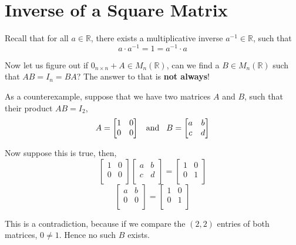 \newpage
\section{Inverse of a Square Matrix}
Recall that for all $a \in \mathbb{R}$, there exists a multiplicative inverse $a^{-1} \in \mathbb{R}$, such that 
$$a \cdot a^{-1} = 1 =  a^{-1} \cdot a$$

Now let us figure out if $0_{n \times n} + A \in M_n(\mathbb{R})$, can we find a $B \in M_n(\mathbb{R})$ such that $AB = I_n = BA$? The answer to that is \textbf{not always}!

As a counterexample, suppose that we have two matrices $A$ and $B$, such that their product $AB = I_2$,
$$A = \left [
\begin{matrix}
1 & 0 \\
0 & 0 \\
\end{matrix} \right ] \hspace{0.3cm} \text{and} \hspace{0.3cm} 
B = \left [
\begin{matrix}
a & b \\
c & d \\
\end{matrix} \right ]$$

Now suppose this is true, then,
$$\left [
\begin{matrix}
1 & 0 \\
0 & 0 \\
\end{matrix} \right ]
\left [
\begin{matrix}
a & b \\
c & d \\
\end{matrix} \right ] = 
\left [
\begin{matrix}
1 & 0 \\
0 & 1 \\
\end{matrix} \right ]$$
$$\left [
\begin{matrix}
a & b \\
0 & 0 \\
\end{matrix} \right ] = 
\left [
\begin{matrix}
1 & 0 \\
0 & 1 \\
\end{matrix} \right ]$$

This is a contradiction, because if we compare the $(2, 2)$ entries of both matrices, $0 \neq 1$. Hence no such $B$ exists.

